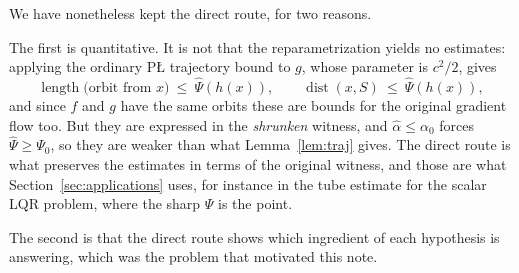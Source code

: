 \documentclass[11pt]{article}
\theoremstyle{plain}
\theoremstyle{definition}
\theoremstyle{remark}
\DeclareMathOperator{\dist}{dist}
\begin{document}
We have nonetheless kept the direct route, for two reasons.

The first is quantitative. It is not that the reparametrization yields no
estimates: applying the ordinary P\L{} trajectory bound to $g$, whose parameter is
$c^2/2$, gives
\[
  \operatorname{length}\bigl(\text{orbit from } x\bigr) \ \le\ \hat\Psi(h(x)) ,
  \qquad \dist(x,S) \ \le\ \hat\Psi(h(x)) ,
\]
and since $f$ and $g$ have the same orbits these are bounds for the original
gradient flow too. But they are expressed in the \emph{shrunken} witness, and
$\hat\alpha\le\alpha_0$ forces $\hat\Psi\ge\Psi_0$, so they are weaker than what
Lemma~\ref{lem:traj} gives. The direct route is what preserves the estimates in
terms of the original witness, and those are what
Section~\ref{sec:applications} uses, for instance in the tube estimate for the
scalar LQR problem, where the sharp $\Psi$ is the point.

The second is that the direct route shows which ingredient of \cite{BCR2026} each
hypothesis is answering, which was the problem that motivated this note.
\end{document}
